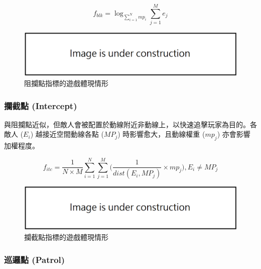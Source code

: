 \begin{equation}
    f_{blk}=\log _{\sum_{i=1}^{N} mp_{i}} \sum_{j=1}^{M} e_{j}
\end{equation}

\begin{figure}[ht]
  \begin{center}
    \includegraphics[width=1.0\textwidth]{figures/under_construction.png}
    \caption{阻攔點指標的遊戲體現情形}
    \label{fig:fitnesses-block-gameplay}
  \end{center}
\end{figure}

\subsubsection{攔截點 (Intercept)}
\label{sssec:method-segments-fitnesses-intercept}

與阻攔點近似，但敵人會被配置於動線附近非動線上，以快速追擊玩家為目的。各敵人 ($E_{i}$) 越接近空間動線各點 ($MP_{j}$) 時影響愈大，且動線權重 ($mp_{j}$) 亦會影響加權程度。

\begin{equation}
    f_{itc} = \frac{1}{N \times M} \sum_{i=1}^{N} \sum_{j=1}^{M} \Big( \frac{1}{dist(E_{i}, MP_{j})} \times mp_{j} \Big), 
    E_{i} \neq MP_{j}
\end{equation}

\begin{figure}[ht]
  \begin{center}
    \includegraphics[width=1.0\textwidth]{figures/under_construction.png}
    \caption{攔截點指標的遊戲體現情形}
    \label{fig:fitnesses-intercept-gameplay}
  \end{center}
\end{figure}

\subsubsection{巡邏點 (Patrol)}
\label{sssec:method-segments-fitnesses-patrol}

